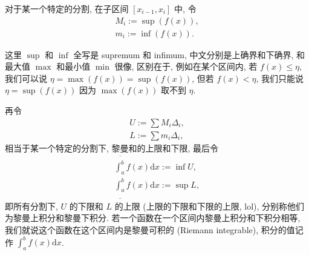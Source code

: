 \begin{tcolorbox}[size=fbox, breakable, enhanced jigsaw, title={更加严格的版本 - 选读}]

对于某一个特定的分割, 在子区间 $[x_{i-1},x_i]$ 中, 令
\begin{gather*}
M_i:=\sup \left(f(x)\right),\\
m_i:=\inf \left(f(x)\right).
\end{gather*}

\begin{newquote}
这里 $\sup$ 和 $\inf$ 全写是 supremum 和 infimum,
中文分别是上确界和下确界, 和最大值 $\max$ 和最小值 $\min$ 很像,
区别在于, 例如在某个区间内, 若 $f(x)\le \eta$, 我们可以说
$\eta=\max \left(f(x)\right)=\sup \left(f(x)\right)$, 但若
$f(x)<\eta$, 我们只能说 $\eta=\sup \left(f(x)\right)$ 因为
$\max \left(f(x)\right)$ 取不到 $\eta$.
\end{newquote}

再令
\begin{gather*}
U:=\sum M_i\Delta_i,\\
L:=\sum m_i\Delta_i,
\end{gather*}
相当于某一个特定的分割下, 黎曼和的上限和下限, 最后令
\begin{gather*}
\overline{\int_a^b}f(x)\mathrm{d}x:=\inf U,\\
\underline{\int_a^b}f(x)\mathrm{d}x:=\sup L,
\end{gather*}
即所有分割下, $U$ 的下限和 $L$ 的上限 (上限的下限和下限的上限,
lol), 分别称他们为黎曼上积分和黎曼下积分.
若一个函数在一个区间内黎曼上积分和下积分相等,
我们就说这个函数在这个区间内是黎曼可积的 (Riemann integrable),
积分的值记作 $\int_a^bf(x)\mathrm{d}x$.
\end{tcolorbox}